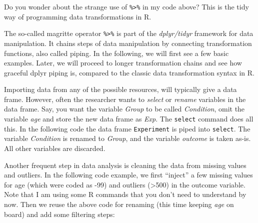\documentclass[]{svmono}
\newenvironment{Shaded}{\begin{snugshade}}{\end{snugshade}}
\newcommand{\KeywordTok}[1]{\textcolor[rgb]{0.13,0.29,0.53}{\textbf{#1}}}
\newcommand{\DataTypeTok}[1]{\textcolor[rgb]{0.13,0.29,0.53}{#1}}
\newcommand{\DecValTok}[1]{\textcolor[rgb]{0.00,0.00,0.81}{#1}}
\newcommand{\StringTok}[1]{\textcolor[rgb]{0.31,0.60,0.02}{#1}}
\newcommand{\OperatorTok}[1]{\textcolor[rgb]{0.81,0.36,0.00}{\textbf{#1}}}
\newcommand{\NormalTok}[1]{#1}
\begin{document}
Do you wonder about the strange use of \texttt{\%\textgreater{}\%} in my
code above? This is the tidy way of programming data transformations in
R.

The so-called magritte operator \texttt{\%\textgreater{}\%} is part of
the \emph{dplyr/tidyr} framework for data manipulation. It chains steps
of data manipulation by connecting transformation functions, also called
piping. In the following, we will first see a few basic examples. Later,
we will proceed to longer transformation chains and see how graceful
dplyr piping is, compared to the classic data transformation syntax in
R.

Importing data from any of the possible resources, will typically give a
data frame. However, often the researcher wants to \emph{select} or
\emph{rename} variables in the data frame. Say, you want the variable
\emph{Group} to be called \emph{Condition}, omit the variable \emph{age}
and store the new data frame as \emph{Exp}. The \texttt{select} command
does all this. In the following code the data frame \texttt{Experiment}
is piped into \texttt{select}. The variable \emph{Condition} is renamed
to \emph{Group}, and the variable \emph{outcome} is taken as-is. All
other variables are discarded.

\begin{Shaded}
\end{Shaded}

Another frequent step in data analysis is cleaning the data from missing
values and outliers. In the following code example, we first ``inject''
a few missing values for age (which were coded as -99) and outliers
(\textgreater{}500) in the outcome variable. Note that I am using some R
commands that you don't need to understand by now. Then we reuse the
above code for renaming (this time keeping \emph{age} on board) and add
some filtering steps:

\begin{Shaded}
\end{Shaded}
\end{document}
